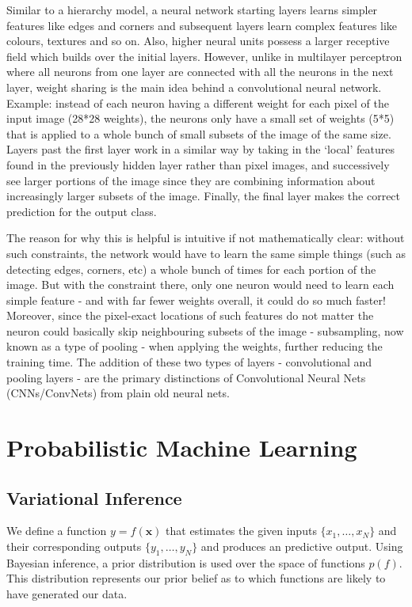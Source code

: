 Similar to a hierarchy model, a neural network starting layers learns simpler features like edges and corners and subsequent layers learn complex features like colours, textures and so on. Also, higher neural units possess a larger receptive field which builds over the initial layers. However, unlike in multilayer perceptron where all neurons from one layer are connected with all the neurons in the next layer, weight sharing is the main idea behind a convolutional neural network. 
Example: instead of each neuron having a different weight for each pixel of the input image (28*28 weights), the neurons only have a small set of weights (5*5) that is applied to a whole bunch of small subsets of the image of the same size. Layers past the first layer work in a similar way by taking in the ‘local’ features found in the previously hidden layer rather than pixel images, and successively see larger portions of the image since they are combining information about increasingly larger subsets of the image. Finally, the final layer makes the correct prediction for the output class.

The reason for why this is helpful is intuitive if not mathematically clear: without such constraints, the network would have to learn the same simple things (such as detecting edges, corners, etc) a whole bunch of times for each portion of the image. But with the constraint there, only one neuron would need to learn each simple feature - and with far fewer weights overall, it could do so much faster! Moreover, since the pixel-exact locations of such features do not matter the neuron could basically skip neighbouring subsets of the image - subsampling, now known as a type of pooling - when applying the weights, further reducing the training time. The addition of these two types of layers - convolutional and pooling layers - are the primary distinctions of Convolutional Neural Nets (CNNs/ConvNets) from plain old neural nets.


\section{Probabilistic Machine Learning}
\subsection{Variational Inference}

We define a function $y = f(\mathbf{x})$ that estimates the given inputs $\{ x_1, \hdots, x_N \}$ and their corresponding outputs $\{y_1, \hdots, y_N\}$ and produces an predictive output. Using Bayesian inference, a prior distribution is used over the space of functions $p(f)$. This distribution represents our prior belief as to which functions are likely to have generated our data. 

